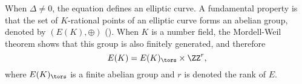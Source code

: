 When $\Delta\neq0$, the equation defines an elliptic curve. A fundamental property is that the set of $K$-rational points of an elliptic curve forms an abelian group, denoted by $(E(K),\oplus)$ (\cite[\S III.2]{S1}). When $K$ is a number field, the Mordell-Weil theorem shows that this group is also finitely generated, and therefore 
$$E(K)=E(K)_{\tors}\times\ZZ^r,$$
where $E(K)_{\tors}$ is a finite abelian group and $r$ is denoted the rank of $E$.
